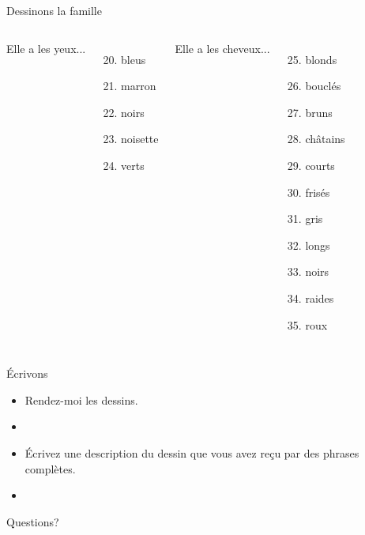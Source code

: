 \documentclass{beamer}
\begin{document}
\begin{frame}{Dessinons la famille}
\begin{columns}
        Elle a les yeux...
        \begin{enumerate}
          \setcounter{enumi}{19}
          \item bleus
          \item marron
          \item noirs
          \item noisette
          \item verts
        \end{enumerate}
        Elle a les cheveux...
        \begin{enumerate}
          \setcounter{enumi}{24}
          \item blonds
          \item bouclés
          \item bruns
          \item châtains
          \item courts
          \item frisés
          \item gris
          \item longs
          \item noirs
          \item raides
          \item roux
        \end{enumerate}
    \end{columns}
  \end{frame}

  \begin{frame}{Écrivons}
    \begin{itemize}
      \item Rendez-moi les dessins.
      \item[] 
      \item<2-> Écrivez une description du dessin que vous avez reçu par des phrases complètes.
      \item<2->[] 
    \end{itemize}
  \end{frame}

  \begin{frame}{}
    \begin{center}
      \Large Questions?
    \end{center}
  \end{frame}
\end{document}
